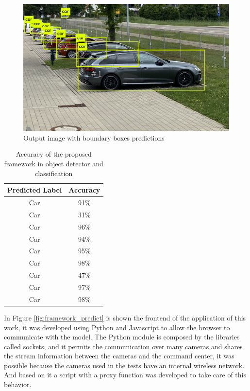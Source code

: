 \begin{figure}[H]
\centering
\includegraphics[scale=0.3]{imagens/predictions.jpg}
\caption{Output image with boundary boxes predictions}
\label{fig:park_predict}
\end{figure}



\begin{table}[H]
\centering
\caption{Accuracy of the proposed framework in object detector and classification}
\begin{tabular}{c|c}
\hline
Predicted Label & Accuracy \\ \hline
Car             & 91\%     \\ \hline
Car             & 31\%     \\ \hline
Car             & 96\%     \\ \hline
Car             & 94\%     \\ \hline
Car             & 95\%     \\ \hline
Car             & 98\%     \\ \hline
Car             & 47\%     \\ \hline
Car             & 97\%     \\ \hline
Car             & 98\%     \\ \hline
\end{tabular}
\label{tab:accuracy}
\end{table}



In Figure \ref{fig:framework_predict} is shown the frontend of the application of this work, it was developed using Python and Javascript to allow the browser to communicate with the model. The Python module is composed by the libraries called sockets, and it permits the communication over many cameras and shares the stream information between the cameras and the command center, it was possible because the cameras used in the tests have an internal wireless network. And based on it a script with a proxy function was developed to take care of this behavior. 

